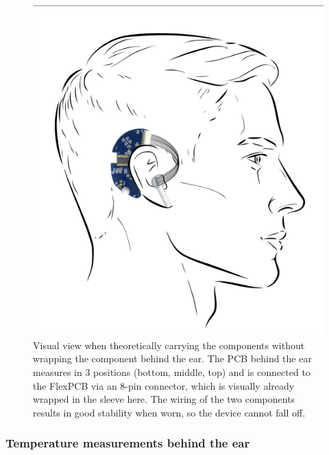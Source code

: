 \begin{figure}[t]
    \centering
    \includegraphics[width=\textwidth/2]{thesis-doc/images/prototype/prototype_on_head_visual.png}
    \caption{Visual view when theoretically carrying the components without wrapping the component behind the ear. The PCB behind the ear measures in 3 positions (bottom, middle, top) and is connected to the FlexPCB via an 8-pin connector, which is visually already wrapped in the sleeve here. The wiring of the two components results in good stability when worn, so the device cannot fall off.}
    \label{fig:design:prototype_on_head_visual}
\end{figure}

\subsubsection{Temperature measurements behind the ear}


